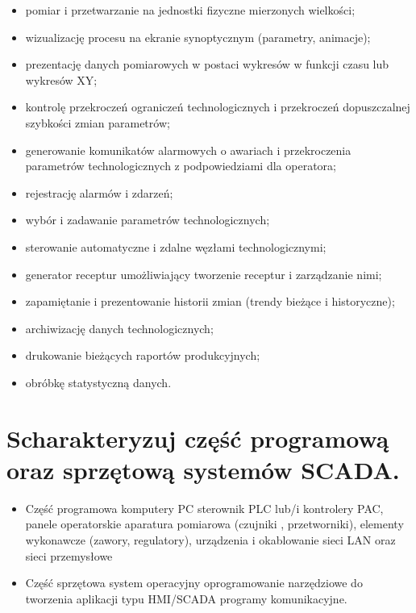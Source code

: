 \documentclass{article}
\begin{document}
	\begin{itemize}
	
	\item pomiar i przetwarzanie na jednostki fizyczne mierzonych wielkości;
	\item wizualizację procesu na ekranie synoptycznym (parametry, animacje);
	\item prezentację danych pomiarowych w postaci wykresów w funkcji czasu lub
	wykresów XY;
	\item kontrolę przekroczeń ograniczeń technologicznych i przekroczeń dopuszczalnej
	szybkości zmian parametrów;
	\item generowanie komunikatów alarmowych o awariach i przekroczenia parametrów
	technologicznych z podpowiedziami dla operatora;
	\item rejestrację alarmów i zdarzeń;
	\item wybór i zadawanie parametrów technologicznych;
	\item sterowanie automatyczne i zdalne węzłami technologicznymi;
	\item generator receptur umożliwiający tworzenie receptur i zarządzanie nimi;
	\item zapamiętanie i prezentowanie historii zmian (trendy bieżące i historyczne);
	\item archiwizację danych technologicznych;
	\item drukowanie bieżących raportów produkcyjnych;
	\item obróbkę statystyczną danych.
\end{itemize}
	
	
	
	
	\section{Scharakteryzuj część programową oraz sprzętową systemów SCADA.}
	\begin{itemize}
		\item Część programowa
		  \subitem komputery PC
		  \subitem sterownik PLC lub/i kontrolery PAC,
		  \subitem panele operatorskie
		  \subitem aparatura pomiarowa (czujniki , przetworniki),
		  \subitem elementy wykonawcze (zawory, regulatory),
		  \subitem  urządzenia i okablowanie
		  \subitem sieci LAN oraz sieci przemysłowe		  
	    \item Część sprzętowa
		  \subitem system operacyjny
		  \subitem oprogramowanie
		  \subitem narzędziowe do tworzenia aplikacji typu HMI/SCADA
		  \subitem programy komunikacyjne.		  
		\end{itemize}
	
\end{document}
